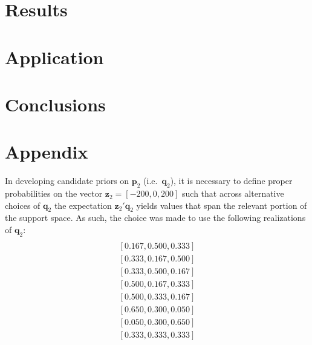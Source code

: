 \documentclass[english]{article}
\begin{document}

\section{Results}
\label{sec: results}


\section{Application}
\label{sec: app}


\section{Conclusions}
\label{sec: conc}


\newpage
\section*{Appendix}
\label{sec: appendix}

In developing candidate priors on $\mathbf{p}_2$ 
(i.e.\ $\mathbf{q}_2$), it is necessary to define proper probabilities on
the vector $\mathbf{z}_2 = [-200, 0, 200]$ such that across alternative 
choices of $\mathbf{q}_2$ the expectation $\mathbf{z}_2'\mathbf{q}_2$  
yields values that span the relevant portion of the support space. 
As such, the choice was made to use the following realizations of 
$\mathbf{q}_2$:
\begin{align*}
[0.167, 0.333, 0.500] \\
[0.167, 0.500, 0.333] \\
[0.333, 0.167, 0.500] \\
[0.333, 0.500, 0.167] \\
[0.500, 0.167, 0.333] \\
[0.500, 0.333, 0.167] \\
[0.650, 0.300, 0.050] \\
[0.050, 0.300, 0.650] \\
[0.333, 0.333, 0.333]
\end{align*}
\end{document}
